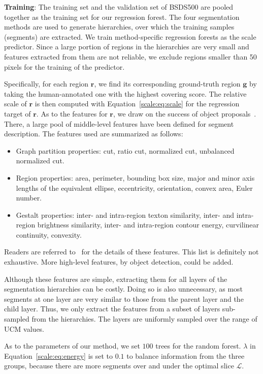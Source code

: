 \textbf{Training}: The training set and the validation set of BSDS500
are pooled together as the training set for our regression forest. The
four segmentation methods are used to generate hierarchies,
over which the training samples (segments) are extracted.
We train method-specific regression forests
as the scale predictor.
Since a large portion of regions in the hierarchies are very small and
features extracted from them are not reliable, we exclude regions smaller
than 50 pixels for the training of the predictor.

Specifically, for each region $\mathbf{r}$, we find its corresponding
ground-truth region $\mathbf{g}$ by taking the human-annotated one with the
highest covering score. 
The relative scale of $\mathbf{r}$ is then computed with
Equation~\ref{scale:eq:scale} for the regression target of $\mathbf{r}$.
As to the features for $\mathbf{r}$, we draw on the
success of object proposals~\citep{carreira2010constrained,arbelaez2014multiscale}.
There, a large pool of middle-level features have been defined for segment description.
The features used are summarized as follows:
\begin{itemize}
\item Graph partition properties: cut, ratio cut, normalized cut, unbalanced normalized cut. 
\item Region properties:  area, perimeter, bounding box size, major and minor axis lengths of the equivalent ellipse, eccentricity, orientation, convex area, Euler number.
\item Gestalt properties: inter- and intra-region texton similarity, inter- and intra-region brightness similarity, inter- and intra-region contour energy, curvilinear continuity, convexity.
\end{itemize}
Readers are referred to~\citep{carreira2010constrained} for the details
of these features. This list is definitely not exhaustive.
More high-level features, \eg by object detection, could be added.

Although these features are simple, extracting them for all layers of
the segmentation hierarchies can be costly.
Doing so is also unnecessary, as most segments at one layer are very
similar to those from the parent layer and the child layer.
Thus, we only extract the features from a subset of layers
sub-sampled from the hierarchies.
The layers are uniformly sampled over the range of UCM values. 

As to the parameters of our method, we set $100$ trees for the random
forest. $\lambda$ in Equation~\ref{scale:eq:energy} is set to $0.1$ to
balance information from the three groups, because there are more
segments over and under the optimal slice $\mathcal{L}$. %

